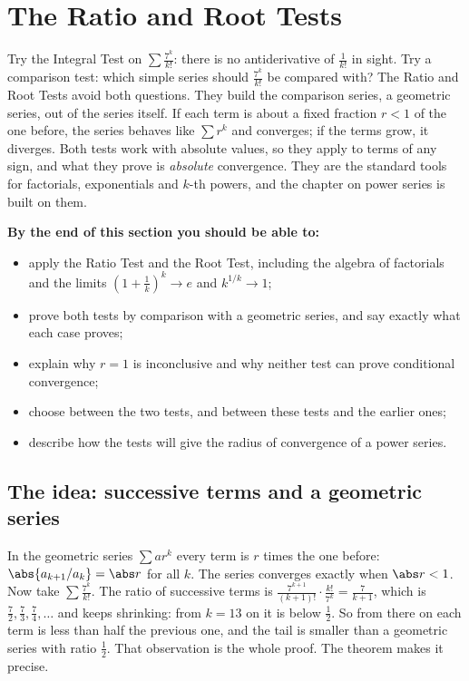 \documentclass[11pt]{article}
\begin{document}
\section{The Ratio and Root Tests}

\begin{guide}
Try the Integral Test on $\sum\frac{7^k}{k!}$: there is no antiderivative of $\frac1{k!}$ in sight. Try a comparison test: which simple series should $\frac{7^k}{k!}$ be compared with? The Ratio and Root Tests avoid both questions. They build the comparison series, a geometric series, out of the series itself. If each term is about a fixed fraction $r<1$ of the one before, the series behaves like $\sum r^k$ and converges; if the terms grow, it diverges. Both tests work with absolute values, so they apply to terms of any sign, and what they prove is \emph{absolute} convergence. They are the standard tools for factorials, exponentials and $k$-th powers, and the chapter on power series is built on them.
\end{guide}

\textbf{By the end of this section you should be able to:}
\begin{itemize}
  \item apply the Ratio Test and the Root Test, including the algebra of factorials and the limits $\left(1+\frac1k\right)^k\to e$ and $k^{1/k}\to1$;
  \item prove both tests by comparison with a geometric series, and say exactly what each case proves;
  \item explain why $r=1$ is inconclusive and why neither test can prove conditional convergence;
  \item choose between the two tests, and between these tests and the earlier ones;
  \item describe how the tests will give the radius of convergence of a power series.
\end{itemize}

\subsection*{The idea: successive terms and a geometric series}

In the geometric series $\sum ar^k$ every term is $r$ times the one before: $\abs{a_{k+1}/a_k}=\abs r$ for all $k$. The series converges exactly when $\abs r<1$. Now take $\sum\frac{7^k}{k!}$. The ratio of successive terms is $\frac{7^{k+1}}{(k+1)!}\cdot\frac{k!}{7^k}=\frac7{k+1}$, which is $\frac72,\frac73,\frac74,\dots$ and keeps shrinking: from $k=13$ on it is below $\frac12$. So from there on each term is less than half the previous one, and the tail is smaller than a geometric series with ratio $\frac12$. That observation is the whole proof. The theorem makes it precise.
\end{document}
